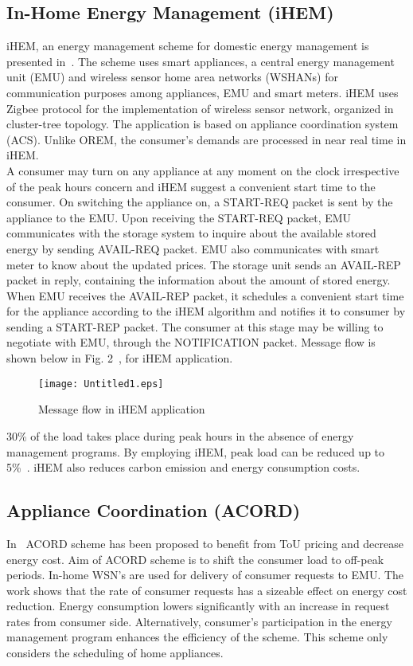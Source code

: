 \documentclass[journal]{IEEEtran}
\begin{document}
\subsection{In-Home Energy Management (iHEM)}
iHEM, an energy management scheme  for domestic energy management is presented in~\cite{erol2011wireless}. The scheme uses smart appliances, a central energy management unit (EMU) and wireless sensor home area networks (WSHANs) for communication purposes among appliances, EMU and smart meters. iHEM uses Zigbee protocol for the implementation of wireless sensor network, organized in cluster-tree topology. The application is based on appliance coordination system (ACS). Unlike OREM, the consumer's demands are processed in near real time in iHEM.\\
\indent A consumer may turn on any appliance at any moment on the clock irrespective of the peak hours concern and iHEM suggest a convenient start time to the consumer. On switching the appliance on, a START-REQ packet is sent by the appliance to the EMU. Upon receiving the START-REQ packet, EMU communicates with the storage system to inquire about the available stored energy by sending AVAIL-REQ packet. EMU also communicates with smart meter to know about the updated prices. The storage unit sends an AVAIL-REP packet in reply, containing the information about the amount of stored energy. When EMU receives the AVAIL-REP packet, it schedules a convenient start time for the appliance according to the iHEM algorithm and notifies it to consumer by sending a START-REP packet. The consumer at this stage may be willing to negotiate with EMU, through the NOTIFICATION packet. Message flow is shown below in Fig. 2~\cite{erol2011wireless}, for iHEM application.
\begin{figure}[!h]
\centering
\texttt{[image: Untitled1.eps]}
\caption{Message flow in iHEM application}
\end{figure}
30\% of the load takes place during peak hours in  the absence of energy management programs. By employing iHEM, peak load can be reduced up to 5\%~\cite{erol2011wireless}. iHEM also reduces carbon emission and energy consumption costs.\\
\subsection{Appliance Coordination (ACORD)}
In~\cite{erol2010wireless} ACORD scheme has been proposed to benefit from ToU pricing and decrease energy cost. Aim of ACORD scheme is to shift the consumer load to off-peak periods. In-home WSN’s are used for delivery of consumer requests to EMU. The work shows that the rate of consumer requests has a sizeable effect on energy cost reduction. Energy consumption lowers significantly with an increase in request rates from consumer side. Alternatively, consumer's participation in the energy management program enhances the efficiency of the scheme. This scheme only considers the scheduling of home appliances.\\
\end{document}
